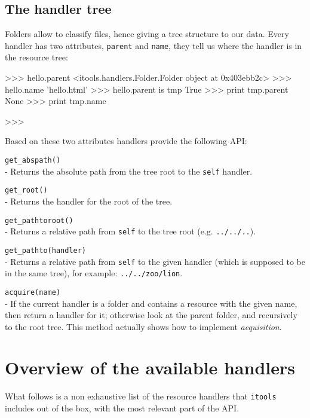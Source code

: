 \subsection{The handler tree}

Folders allow to classify files, hence giving a tree structure to our data.
Every handler has two attributes, {\tt parent} and {\tt name}, they tell us
where the handler is in the resource tree:

\begin{code}
    >>> hello.parent
    <itools.handlers.Folder.Folder object at 0x403ebb2c>
    >>> hello.name  
    'hello.html'
    >>> hello.parent is tmp
    True
    >>> print tmp.parent
    None
    >>> print tmp.name

    >>> 
\end{code}

Based on these two attributes handlers provide the following API:

\begin{api}
  {\tt get\_abspath()}\\
  - Returns the absolute path from the tree root to the {\tt self} handler.

  {\tt get\_root()}\\
  - Returns the handler for the root of the tree.

  {\tt get\_pathtoroot()}\\
  - Returns a relative path from {\tt self} to the tree root (e.g.
    {\tt ../../..}).

  {\tt get\_pathto(handler)}\\
  - Returns a relative path from {\tt self} to the given handler (which is
    supposed to be in the same tree), for example: {\tt ../../zoo/lion}.

  {\tt acquire(name)}\\
  - If the current handler is a folder and contains a resource with the given
    name, then return a handler for it; otherwise look at the parent folder,
    and recursively to the root tree. This method actually shows how to
    implement {\em acquisition}.
\end{api}



\section{Overview of the available handlers}

What follows is a non exhaustive list of the resource handlers that
{\tt itools} includes out of the box, with the most relevant part of the API.

